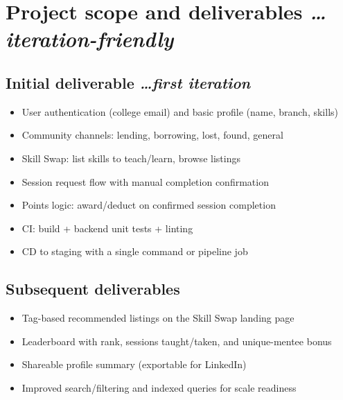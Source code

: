 \documentclass[11pt,a4paper]{article}
\newcommand{\BvrHint}[1]{%
  {\normalfont\normalsize\itshape\hfill #1}}
\begin{document}
\section{Project scope and deliverables %
\BvrHint{\ldots iteration-friendly}}
\subsection{Initial deliverable %
\BvrHint{\ldots first iteration}}
\begin{itemize}[leftmargin=0.7cm]
    \item User authentication (college email) and basic profile (name, branch, skills)
    \item Community channels: lending, borrowing, lost, found, general
    \item Skill Swap: list skills to teach/learn, browse listings
    \item Session request flow with manual completion confirmation
    \item Points logic: award/deduct on confirmed session completion
    \item CI: build + backend unit tests + linting
    \item CD to staging with a single command or pipeline job
\end{itemize}

\subsection{Subsequent deliverables}
\begin{itemize}[leftmargin=0.7cm]
    \item Tag-based recommended listings on the Skill Swap landing page
    \item Leaderboard with rank, sessions taught/taken, and unique-mentee bonus
    \item Shareable profile summary (exportable for LinkedIn)
    \item Improved search/filtering and indexed queries for scale readiness
\end{itemize}
\end{document}

